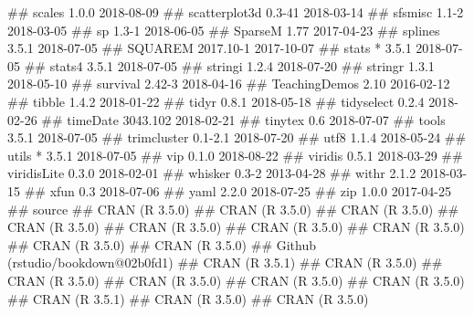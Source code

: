 \documentclass[]{book}
\newenvironment{Shaded}{\begin{snugshade}}{\end{snugshade}}
\newcommand{\NormalTok}[1]{#1}
\theoremstyle{definition}
\theoremstyle{definition}
\theoremstyle{definition}
\theoremstyle{remark}
\begin{document}
\begin{Shaded}
\begin{Highlighting}[]
\NormalTok{##  scales          1.0.0      2018-08-09}
\NormalTok{##  scatterplot3d   0.3-41     2018-03-14}
\NormalTok{##  sfsmisc         1.1-2      2018-03-05}
\NormalTok{##  sp              1.3-1      2018-06-05}
\NormalTok{##  SparseM         1.77       2017-04-23}
\NormalTok{##  splines         3.5.1      2018-07-05}
\NormalTok{##  SQUAREM         2017.10-1  2017-10-07}
\NormalTok{##  stats         * 3.5.1      2018-07-05}
\NormalTok{##  stats4          3.5.1      2018-07-05}
\NormalTok{##  stringi         1.2.4      2018-07-20}
\NormalTok{##  stringr         1.3.1      2018-05-10}
\NormalTok{##  survival        2.42-3     2018-04-16}
\NormalTok{##  TeachingDemos   2.10       2016-02-12}
\NormalTok{##  tibble          1.4.2      2018-01-22}
\NormalTok{##  tidyr           0.8.1      2018-05-18}
\NormalTok{##  tidyselect      0.2.4      2018-02-26}
\NormalTok{##  timeDate        3043.102   2018-02-21}
\NormalTok{##  tinytex         0.6        2018-07-07}
\NormalTok{##  tools           3.5.1      2018-07-05}
\NormalTok{##  trimcluster     0.1-2.1    2018-07-20}
\NormalTok{##  utf8            1.1.4      2018-05-24}
\NormalTok{##  utils         * 3.5.1      2018-07-05}
\NormalTok{##  vip             0.1.0      2018-08-22}
\NormalTok{##  viridis         0.5.1      2018-03-29}
\NormalTok{##  viridisLite     0.3.0      2018-02-01}
\NormalTok{##  whisker         0.3-2      2013-04-28}
\NormalTok{##  withr           2.1.2      2018-03-15}
\NormalTok{##  xfun            0.3        2018-07-06}
\NormalTok{##  yaml            2.2.0      2018-07-25}
\NormalTok{##  zip             1.0.0      2017-04-25}
\NormalTok{##  source                           }
\NormalTok{##  CRAN (R 3.5.0)                   }
\NormalTok{##  CRAN (R 3.5.0)                   }
\NormalTok{##  CRAN (R 3.5.0)                   }
\NormalTok{##  CRAN (R 3.5.0)                   }
\NormalTok{##  CRAN (R 3.5.0)                   }
\NormalTok{##  CRAN (R 3.5.0)                   }
\NormalTok{##  CRAN (R 3.5.0)                   }
\NormalTok{##  CRAN (R 3.5.0)                   }
\NormalTok{##  CRAN (R 3.5.0)                   }
\NormalTok{##  Github (rstudio/bookdown@02b0fd1)}
\NormalTok{##  CRAN (R 3.5.1)                   }
\NormalTok{##  CRAN (R 3.5.0)                   }
\NormalTok{##  CRAN (R 3.5.0)                   }
\NormalTok{##  CRAN (R 3.5.0)                   }
\NormalTok{##  CRAN (R 3.5.0)                   }
\NormalTok{##  CRAN (R 3.5.0)                   }
\NormalTok{##  CRAN (R 3.5.1)                   }
\NormalTok{##  CRAN (R 3.5.0)                   }
\NormalTok{##  CRAN (R 3.5.0)                   }

\end{Highlighting}
\end{Shaded}
\end{document}
